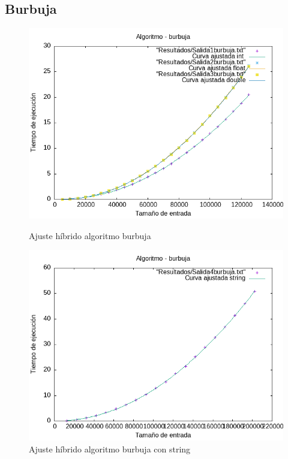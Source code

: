 \documentclass[11pt]{article}
\begin{document}
\subsection*{Burbuja}
\begin{figure}[H]
    \begin{minipage}{0.5\textwidth}
        \centering
        \includegraphics[width=\linewidth]{assets/AjusteHibrido_latex/Hibridoburbuja/burbuja_hib.png}
        \caption{Ajuste híbrido algoritmo burbuja}
        \label{fig:burbuja}
    \end{minipage}%
    \begin{minipage}{0.5\textwidth}
        \centering
        \includegraphics[width=\linewidth]{assets/AjusteHibrido_latex/Hibridoburbuja/burbujastring_hib.png}
        \caption{Ajuste híbrido algoritmo burbuja con string}
        \label{fig:burbujastring}
    \end{minipage}
\end{figure}
\end{document}

